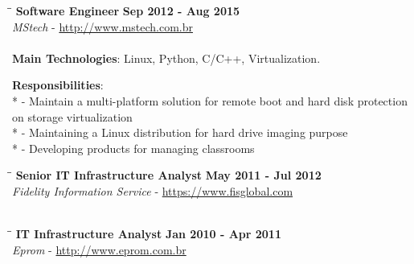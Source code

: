 \documentclass[margin]{res}
\begin{document}
\begin{resume}
\vspace{-0.1in}
\begin{tabbing}
  \hspace{2.3in}\= \hspace{1.7in}\= \kill %
  \textbf{Software Engineer}    \>\>\textbf{Sep 2012 - Aug 2015}\\
  \textit{MStech} - \url{http://www.mstech.com.br}\\\\
  \textbf{Main Technologies}: Linux, Python, C/C++, Virtualization.
\end{tabbing}\vspace{-20pt}      %
\vspace{2mm}\textbf{Responsibilities}: \\*
  - Maintain a multi-platform solution for remote boot and hard disk protection
on storage virtualization \\*
  - Maintaining a Linux distribution for hard drive imaging purpose \\*
  - Developing products for managing classrooms\\

\vspace{-0.1in}
\begin{tabbing}
  \hspace{2.3in}\= \hspace{1.7in}\= \kill %
  \textbf{Senior IT Infrastructure Analyst}    \>\>\textbf{May 2011 - Jul 2012}\\
  \textit{Fidelity Information Service} - \url{https://www.fisglobal.com}\\\\
\end{tabbing}\vspace{-20pt}      %


\vspace{-0.1in}
\begin{tabbing}
  \hspace{2.3in}\= \hspace{1.7in}\= \kill %
  \textbf{IT Infrastructure Analyst}    \>\>\textbf{Jan 2010 - Apr 2011}\\
  \textit{Eprom} - \url{http://www.eprom.com.br}\\\\
\end{tabbing}\vspace{-20pt}      %



\end{resume}
\end{document}
